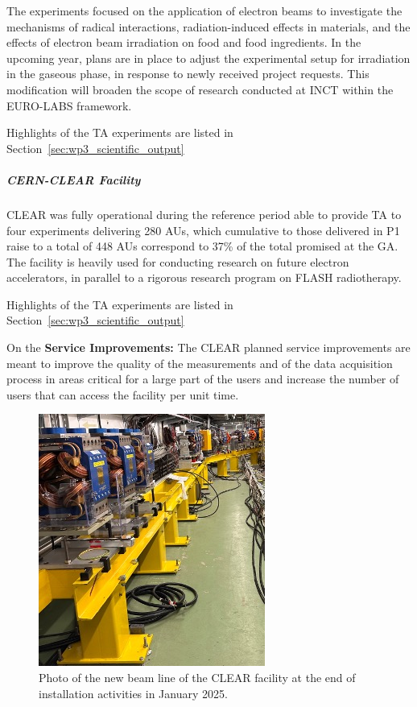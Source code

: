 {The experiments focused on the application of electron beams to investigate the mechanisms of radical interactions, radiation-induced effects in materials, and the effects of electron beam irradiation on food and food ingredients. In the upcoming year, plans are in place to adjust the experimental setup for irradiation in the gaseous phase, in response to newly received project requests. This modification will broaden the scope of research conducted at INCT within the EURO-LABS framework.

Highlights of the TA experiments are listed in Section~\ref{sec:wp3_scientific_output}


\subparagraph*{CERN-CLEAR Facility}

CLEAR was fully operational during the reference period able to provide TA to four experiments delivering 280 AUs, which cumulative to those delivered in P1 raise to a total of 448 AUs correspond to 37\% of the total promised at the GA. 
The facility is heavily used for conducting research on future electron accelerators, in parallel to a rigorous research program on FLASH radiotherapy. 

Highlights of the TA experiments are listed in Section~\ref{sec:wp3_scientific_output}

On the \textbf{Service Improvements:}
The CLEAR planned service improvements are meant to improve the quality of the measurements and of the data acquisition process in areas critical for a large part of the users and increase the number of users that can access the facility per unit time. 
\begin{figure}[H]
    \centering
    \includegraphics[width=0.60\linewidth]{graphics/CLEAR-2ndBLJan25.jpg}
    \caption{%
    Photo of the new beam line of the CLEAR facility at the end of installation activities in January 2025.}
    \label{fig:wp3-clear-2ndbl-inst}
\end{figure}

}
